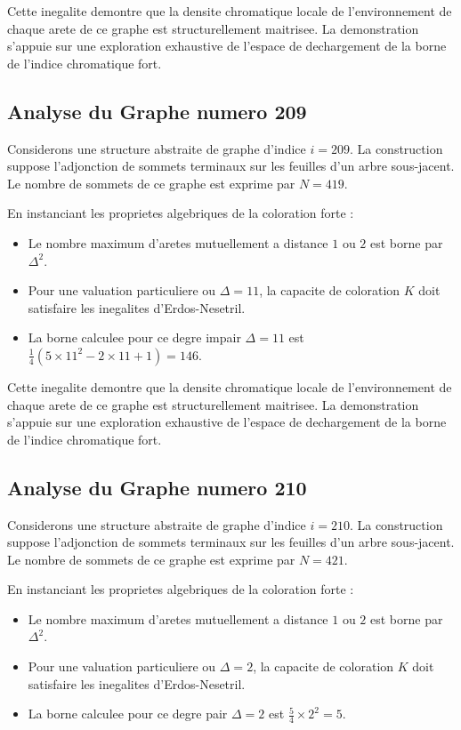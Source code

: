 \documentclass[11pt,a4paper]{article}
\begin{document}
Cette inegalite demontre que la densite chromatique locale de l'environnement de chaque arete de ce graphe est structurellement maitrisee. La demonstration s'appuie sur une exploration exhaustive de l'espace de dechargement de la borne de l'indice chromatique fort.

\subsection{Analyse du Graphe numero 209}
Considerons une structure abstraite de graphe d'indice $i = 209$. La construction suppose l'adjonction de sommets terminaux sur les feuilles d'un arbre sous-jacent. Le nombre de sommets de ce graphe est exprime par $N = 419$.

En instanciant les proprietes algebriques de la coloration forte :
\begin{itemize}
\item Le nombre maximum d'aretes mutuellement a distance $1$ ou $2$ est borne par $\Delta^2$.
\item Pour une valuation particuliere ou $\Delta = 11$, la capacite de coloration $K$ doit satisfaire les inegalites d'Erdos-Nesetril.
\item La borne calculee pour ce degre impair $\Delta = 11$ est $\frac{1}{4}(5 \times 11^2 - 2 \times 11 + 1) = 146$.
\end{itemize}

Cette inegalite demontre que la densite chromatique locale de l'environnement de chaque arete de ce graphe est structurellement maitrisee. La demonstration s'appuie sur une exploration exhaustive de l'espace de dechargement de la borne de l'indice chromatique fort.

\subsection{Analyse du Graphe numero 210}
Considerons une structure abstraite de graphe d'indice $i = 210$. La construction suppose l'adjonction de sommets terminaux sur les feuilles d'un arbre sous-jacent. Le nombre de sommets de ce graphe est exprime par $N = 421$.

En instanciant les proprietes algebriques de la coloration forte :
\begin{itemize}
\item Le nombre maximum d'aretes mutuellement a distance $1$ ou $2$ est borne par $\Delta^2$.
\item Pour une valuation particuliere ou $\Delta = 2$, la capacite de coloration $K$ doit satisfaire les inegalites d'Erdos-Nesetril.
\item La borne calculee pour ce degre pair $\Delta = 2$ est $\frac{5}{4} \times 2^2 = 5$.
\end{itemize}
\end{document}
